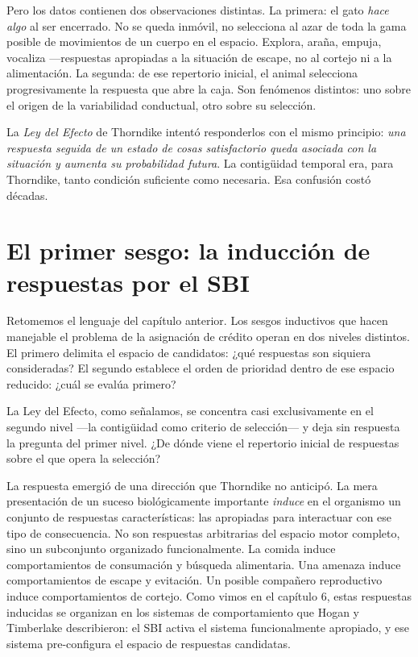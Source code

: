 \documentclass[
  letterpaper,
  DIV=11,
  numbers=noendperiod]{scrreprt}
\begin{document}
\begin{tcolorbox}[enhanced jigsaw, arc=.35mm, bottomrule=.15mm, breakable, colback=white, colframe=quarto-callout-note-color-frame, left=2mm, leftrule=.75mm, opacityback=0, rightrule=.15mm, toprule=.15mm]
Pero los datos contienen dos observaciones distintas. La primera: el
gato \emph{hace algo} al ser encerrado. No se queda inmóvil, no
selecciona al azar de toda la gama posible de movimientos de un cuerpo
en el espacio. Explora, araña, empuja, vocaliza ---respuestas apropiadas
a la situación de escape, no al cortejo ni a la alimentación. La
segunda: de ese repertorio inicial, el animal selecciona progresivamente
la respuesta que abre la caja. Son fenómenos distintos: uno sobre el
origen de la variabilidad conductual, otro sobre su selección.

La \emph{Ley del Efecto} de Thorndike intentó responderlos con el mismo
principio: \emph{una respuesta seguida de un estado de cosas
satisfactorio queda asociada con la situación y aumenta su probabilidad
futura}. La contigüidad temporal era, para Thorndike, tanto condición
suficiente como necesaria. Esa confusión costó décadas.

\section{El primer sesgo: la inducción de respuestas por el
SBI}\label{el-primer-sesgo-la-inducciuxf3n-de-respuestas-por-el-sbi}

Retomemos el lenguaje del capítulo anterior. Los sesgos inductivos que
hacen manejable el problema de la asignación de crédito operan en dos
niveles distintos. El primero delimita el espacio de candidatos: ¿qué
respuestas son siquiera consideradas? El segundo establece el orden de
prioridad dentro de ese espacio reducido: ¿cuál se evalúa primero?

La Ley del Efecto, como señalamos, se concentra casi exclusivamente en
el segundo nivel ---la contigüidad como criterio de selección--- y deja
sin respuesta la pregunta del primer nivel. ¿De dónde viene el
repertorio inicial de respuestas sobre el que opera la selección?

La respuesta emergió de una dirección que Thorndike no anticipó. La mera
presentación de un suceso biológicamente importante \emph{induce} en el
organismo un conjunto de respuestas características: las apropiadas para
interactuar con ese tipo de consecuencia. No son respuestas arbitrarias
del espacio motor completo, sino un subconjunto organizado
funcionalmente. La comida induce comportamientos de consumación y
búsqueda alimentaria. Una amenaza induce comportamientos de escape y
evitación. Un posible compañero reproductivo induce comportamientos de
cortejo. Como vimos en el capítulo 6, estas respuestas inducidas se
organizan en los sistemas de comportamiento que Hogan y Timberlake
describieron: el SBI activa el sistema funcionalmente apropiado, y ese
sistema pre-configura el espacio de respuestas candidatas.


\end{tcolorbox}
\end{document}
